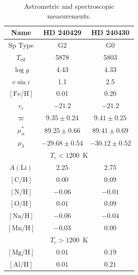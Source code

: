 \documentclass[12pt,letterpaper,margin=1in]{article}
\newcommand*\elem[1]{\ensuremath{\mathrm{#1}}}
\newcommand*\elemH[1]{\ensuremath{[\mathrm{#1}/\elem{H}]}}
\begin{document}
\begin{table}[htpb]
  \caption{Astrometric and spectroscopic measurements.}
  \label{tab:t2}
  \centering
  \begin{tabular}{ccc}
\hline\hline
Name & HD 240429 & HD 240430 \\
\hline
Sp Type                                   & G2                & G0                \\
$T_\mathrm{eff}$                          & 5878              & 5803              \\
$\log{g}$                                 & 4.43              & 4.33              \\
$v\sin{i}$                                & 1.1               & 2.5               \\
$[\elem{Fe}/\elem{H}]$                    & 0.01              & 0.20              \\
$v_r$                                     & $-21.2$           & $-21.2$           \\
$\varpi$ \footnotemark[1]                 & $9.35 \pm 0.24$   & $9.41 \pm 0.25$   \\
$\mu_\alpha^*$ \footnotemark[1]           & $89.25 \pm 0.66$  & $89.41 \pm 0.69$  \\
$\mu_\delta$ \footnotemark[1]             & $-29.68 \pm 0.54$ & $-30.12 \pm 0.52$ \\
\hline
\multicolumn{3}{c}{$T_c < 1200$~K} \\
\hline
$A(\elem{Li})$ \footnotemark[2]           & $2.25$            & $2.75$            \\
$\elemH{C}$                               & $0.00$            & $0.09$            \\
$\elemH{N}$                               & $-0.06$           & $-0.01$           \\
$\elemH{O}$                               & $0.01$            & $0.09$            \\
$\elemH{Na}$                              & $-0.06$           & $-0.04$           \\
$\elemH{Mn}$                              & $-0.03$           & $0.00$            \\
\hline
\multicolumn{3}{c}{$T_c > 1200$~K} \\
\hline
$\elemH{Mg}$                              & $0.01$            & $0.19$            \\
$\elemH{Al}$                              & $0.01$            & $0.21$            \\

\end{tabular}
\end{table}
\end{document}
